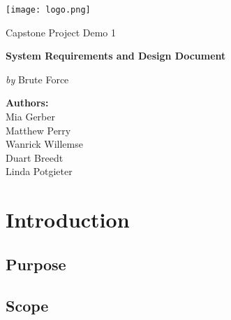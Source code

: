 \documentclass[12pt,a4paper]{article}
\begin{document}
   \begin{titlepage}
      {\selectfont
      	\centering
      	\texttt{[image: logo.png]}\par\vspace{1cm}
      	{\LARGE Capstone Project Demo 1 \par}
      	\vspace{0.25cm}
      	{\huge\bfseries \color{cyan}System Requirements and Design Document\par}
      	\vspace{1cm}
      	{\Large\textit{by} Brute Force\par}
         \vspace{0.25cm}

         \par\vspace{1cm}
         \date{}
         \author{}
         \title{}
         \centering
         \textbf{Authors:}\\
         Mia Gerber\\
         Matthew Perry\\
         Wanrick Willemse\\
         Duart Breedt\\
         Linda Potgieter\\
      }
   \end{titlepage}
   \maketitle
   \tableofcontents
   \newpage

   \section{Introduction}
   	\subsection{Purpose}
   	
   	\subsection{Scope}
   		
\end{document}
